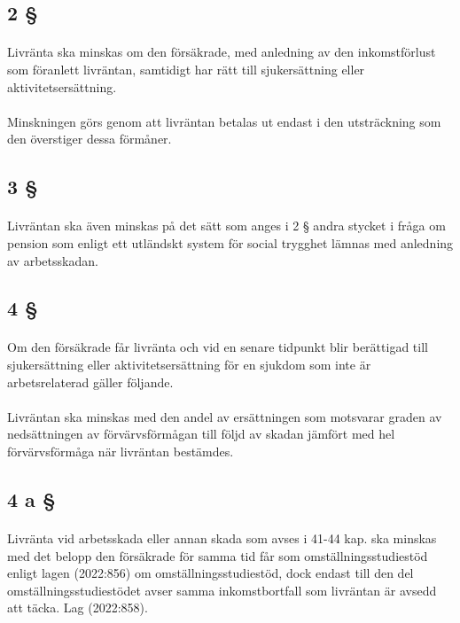 \documentclass[a4paper,notitlepage,openany,10pt]{book}
\begin{document}
\subsection*{2 §}
\paragraph*{}
Livränta ska minskas om den försäkrade, med anledning av den inkomstförlust som föranlett livräntan, samtidigt har rätt till sjukersättning eller aktivitetsersättning.
\paragraph*{}
Minskningen görs genom att livräntan betalas ut endast i den utsträckning som den överstiger dessa förmåner.
\subsection*{3 §}
\paragraph*{}
Livräntan ska även minskas på det sätt som anges i 2 § andra stycket i fråga om pension som enligt ett utländskt system för social trygghet lämnas med anledning av arbetsskadan.
\subsection*{4 §}
\paragraph*{}
Om den försäkrade får livränta och vid en senare tidpunkt blir berättigad till sjukersättning eller aktivitetsersättning för en sjukdom som inte är arbetsrelaterad gäller följande.
\paragraph*{}
Livräntan ska minskas med den andel av ersättningen som motsvarar graden av nedsättningen av förvärvsförmågan till följd av skadan jämfört med hel förvärvsförmåga när livräntan bestämdes.
\subsection*{4 a §}
\paragraph*{}
Livränta vid arbetsskada eller annan skada som avses i 41-44 kap. ska minskas med det belopp den försäkrade för samma tid får som omställningsstudiestöd enligt lagen (2022:856) om omställningsstudiestöd, dock endast till den del omställningsstudiestödet avser samma inkomstbortfall som livräntan är avsedd att täcka.
Lag (2022:858).
\end{document}
